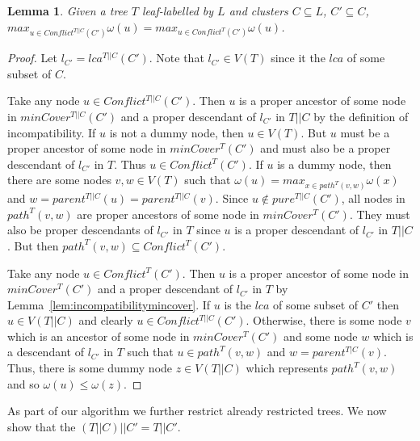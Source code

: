 \documentclass[final,1p,times]{elsarticle}
\newcommand{\weight}{\omega}
\newtheorem{lemma}[theorem]{Lemma}
\begin{document}
    \begin{lemma}
        \label{lem:restrictedweightedmaxincompatible}
        Given a tree $T$ leaf-labelled by $L$ and clusters $C \subseteq L$, $C' \subseteq C$, $max_{u \in Conflict^{T||C}(C')} \weight(u) = max_{u \in Conflict^{T}(C')} \weight(u)$.
    \end{lemma}
        \begin{proof}
            Let $l_{C'} = lca^{T||C}(C')$. Note that $l_{C'} \in V(T)$ since it the $lca$ of some subset of $C$.

            Take any node $u \in Conflict^{T||C}(C')$. Then $u$ is a proper ancestor of some node in $minCover^{T||C}(C')$ and a proper descendant of $l_{C'}$ in $T||C$ by the definition of incompatibility. If $u$ is not a dummy node, then $u \in V(T)$. But $u$ must be a proper ancestor of some node in $minCover^{T}(C')$ and must also be a proper descendant of $l_{C'}$ in $T$. Thus $u \in Conflict^{T}(C')$. If $u$ is a dummy node, then there are some nodes $v, w \in V(T)$ such that $\weight(u) = max_{x \in path^{T}(v, w)} \weight(x)$ and $w = parent^{T||C}(u) = parent^{T||C}(v)$. Since $u \not\in pure^{T||C}(C')$, all nodes in $path^{T}(v, w)$ are proper ancestors of some node in $minCover^{T}(C')$. They must also be proper descendants of $l_{C'}$ in $T$ since $u$ is a proper descendant of $l_{C'}$ in $T||C$. But then $path^{T}(v, w) \subseteq Conflict^{T}(C')$.

            Take any node $u \in Conflict^{T}(C')$. Then $u$ is a proper ancestor of some node in $minCover^{T}(C')$ and a proper descendant of $l_{C'}$ in $T$ by Lemma~\ref{lem:incompatibilitymincover}. If $u$ is the $lca$ of some subset of $C'$ then $u \in V(T||C)$ and clearly $u \in Conflict^{T||C}(C')$. Otherwise, there is some node $v$ which is an ancestor of some node in $minCover^{T}(C')$ and some node $w$ which is a descendant of $l_{C'}$ in $T$ such that $u \in path^{T}(v, w)$ and $w = parent^{T|C}(v)$. Thus, there is some dummy node $z \in V(T||C)$ which represents $path^{T}(v, w)$ and so $\weight(u) \leq \weight(z)$.
        \end{proof}

    As part of our algorithm we further restrict already restricted trees. We now show that the $(T||C)||C' = T||C'$.
    \newline
\end{document}
